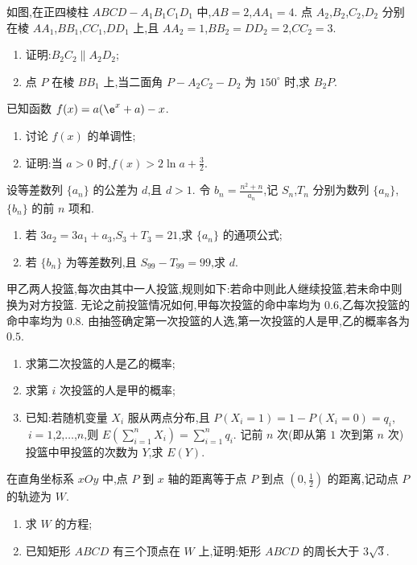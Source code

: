 \begin{problem}
如图,在正四棱柱 \(ABCD-A_1B_1C_1D_1\) 中,\(AB=2\),\(AA_1=4\). 点 \(A_2\),\(B_2\),\(C_2\),\(D_2\) 分别在棱 \(AA_1\),\(BB_1\),\(CC_1\),\(DD_1\) 上,且 \(AA_2=1\),\(BB_2=DD_2=2\),\(CC_2=3\).

\begin{enumerate}
\item 证明:\(B_2C_2\parallel A_2D_2\);
\item 点 \(P\) 在棱 \(BB_1\) 上,当二面角 \(P-A_2C_2-D_2\) 为 \(150^\circ\) 时,求 \(B_2P\).
\end{enumerate}

\end{problem}

\begin{problem}
已知函数 \(f(x)=a(\e^x+a)-x\).
\begin{enumerate}
\item 讨论 \(f(x)\) 的单调性;
\item 证明:当 \(a>0\) 时,\(f(x)>2\ln a+\frac32\).
\end{enumerate}
\end{problem}

\begin{problem}
设等差数列 \(\{a_n\}\) 的公差为 \(d\),且 \(d>1\). 令 \(b_n=\frac{n^2+n}{a_n}\),记 \(S_n\),\(T_n\) 分别为数列 \(\{a_n\}\),\(\{b_n\}\) 的前 \(n\) 项和.
\begin{enumerate}
\item 若 \(3a_2=3a_1+a_3\),\(S_3+T_3=21\),求 \(\{a_n\}\) 的通项公式;
\item 若 \(\{b_n\}\) 为等差数列,且 \(S_{99}-T_{99}=99\),求 \(d\).
\end{enumerate}
\end{problem}

\begin{problem}
甲乙两人投篮,每次由其中一人投篮,规则如下:若命中则此人继续投篮,若未命中则换为对方投篮. 无论之前投篮情况如何,甲每次投篮的命中率均为 \(0.6\),乙每次投篮的命中率均为 \(0.8\). 由抽签确定第一次投篮的人选,第一次投篮的人是甲,乙的概率各为 \(0.5\).
\begin{enumerate}
\item 求第二次投篮的人是乙的概率;
\item 求第 \(i\) 次投篮的人是甲的概率;
\item 已知:若随机变量 \(X_i\) 服从两点分布,且 \(P(X_i=1)=1-P(X_i=0)=q_i\),\(\ i=1\),\(2\),\(\dots\),\(n\),则 \(E\left(\sum_{i=1}^n X_i\right)=\sum_{i=1}^n q_i\).
记前 \(n\) 次(即从第 \(1\) 次到第 \(n\) 次)投篮中甲投篮的次数为 \(Y\),求 \(E(Y)\).
\end{enumerate}
\end{problem}

\begin{problem}
在直角坐标系 \(xOy\) 中,点 \(P\) 到 \(x\) 轴的距离等于点 \(P\) 到点 \((0,\frac12)\) 的距离,记动点 \(P\) 的轨迹为 \(W\).
\begin{enumerate}
\item 求 \(W\) 的方程;
\item 已知矩形 \(ABCD\) 有三个顶点在 \(W\) 上,证明:矩形 \(ABCD\) 的周长大于 \(3\sqrt3\).
\end{enumerate}
\end{problem}

